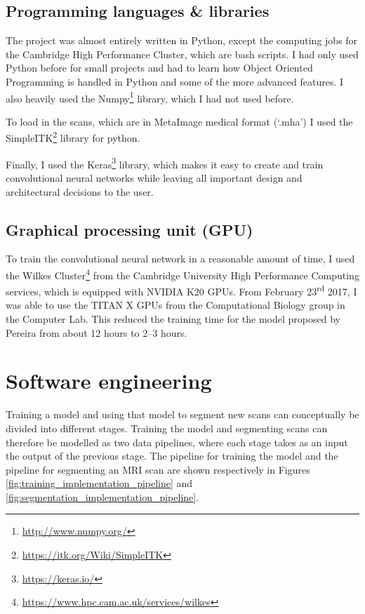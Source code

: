 \documentclass[12pt,a4paper,twoside,openright]{report}
\begin{document}
\subsection{Programming languages \& libraries}
The project was almost entirely written in Python, except the computing jobs for the Cambridge High Performance Cluster, which are bash scripts. I had only used Python before for small projects and had to learn how Object Oriented Programming is handled in Python and some of the more advanced features. I also heavily used the Numpy\footnote{\url{http://www.numpy.org/}} library, which I had not used before.

To load in the scans, which are in MetaImage medical format (`.mha') I used the SimpleITK\footnote{\url{https://itk.org/Wiki/SimpleITK}} library for python.

Finally, I used the Keras\footnote{\url{https://keras.io/}} library, which makes it easy to create and train convolutional neural networks while leaving all important design and architectural decisions to the user. 

\subsection{Graphical processing unit (GPU)}
To train the convolutional neural network in a reasonable amount of time, I used the Wilkes Cluster\footnote{\url{https://www.hpc.cam.ac.uk/services/wilkes}} from the Cambridge University High Performance Computing services, which is equipped with NVIDIA K20 GPUs. From February 23\textsuperscript{rd} 2017, I was able to use the TITAN X GPUs from the Computational Biology group in the Computer Lab. This reduced the training time for the model proposed by Pereira from about 12 hours to 2--3 hours.

\section{Software engineering}
Training a model and using that model to segment new scans can conceptually be divided into different stages. Training the model and segmenting scans can therefore be modelled as two data pipelines, where each stage takes as an input the output of the previous stage. The pipeline for training the model and the pipeline for segmenting an MRI scan are shown respectively in Figures \ref{fig:training_implementation_pipeline} and \ref{fig:segmentation_implementation_pipeline}.
\end{document}
